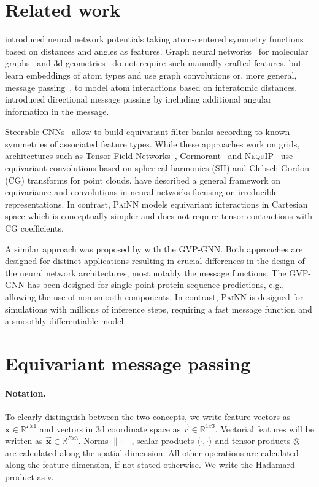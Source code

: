 \documentclass[reprint,
amsmath,amssymb,
 aip,jcp
]{revtex4-2}
\newcommand{\painn}{\textsc{PaiNN}}
\newcommand{\new}[1]{#1}
\begin{document}
\section{Related work}
\citet{behler2007generalized} introduced neural network potentials taking atom-centered symmetry functions based on distances and angles as features.
Graph neural networks~\cite{scarselli2008graph} for molecular graphs~\cite{duvenaud2015convolutional,kearnes2016molecular} and 3d geometries~\cite{schutt2017deep,gilmer2017neural,schutt2018schnet,unke2019physnet,lubbers2018hierarchical} do not require such manually crafted features, but learn embeddings of atom types and use graph convolutions or, more general, message passing~\cite{gilmer2017neural}, to model atom interactions based on interatomic distances.
\citet{klicpera2020directional} introduced directional message passing by including additional angular information in the message.

Steerable CNNs~\cite{cohen2016steerable,weiler20183d} allow to build equivariant filter banks according to known symmetries of associated feature types.
While these approaches work on grids, architectures such as Tensor Field Networks~\cite{thomas2018tensor}, Cormorant~\cite{anderson2019cormorant} and \textsc{NequIP}~\cite{batzner2021se} use equivariant convolutions based on spherical harmonics (SH) and Clebsch-Gordon (CG) transforms for point clouds.
\citet{kondor2018generalization} have described a general framework on equivariance and convolutions in neural networks focusing on irreducible representations.
In contrast, \painn{} models equivariant interactions in Cartesian space which is conceptually simpler and does not require tensor contractions with CG coefficients.
\new{
A similar approach was proposed by \citet{jing2021learning} with the GVP-GNN.
Both approaches are designed for distinct applications resulting in crucial differences in the design of the neural network architectures, most notably the message functions. The GVP-GNN has been designed for single-point protein sequence predictions, e.g., allowing the use of non-smooth components. In contrast, \painn{} is designed for simulations with millions of inference steps, requiring a fast message function and a smoothly differentiable model.}

\section{Equivariant message passing}\label{sec:eqmpnn}

\paragraph{Notation.} To clearly distinguish between the two concepts, we write feature vectors as $\mathbf{x} \in \mathbb{R}^{Fx1}$ and vectors in 3d coordinate space as $\vec{r} \in \mathbb{R}^{1x3}$. Vectorial features will be written as $\vec{\mathbf{x}} \in \mathbb{R}^{Fx3}$. Norms $\| \cdot \|$, scalar products $\langle \cdot, \cdot \rangle$ and tensor products $\otimes$ are calculated along the spatial dimension. All other operations are calculated along the feature dimension, if not stated otherwise. We write the Hadamard product as $\circ$.
\end{document}
